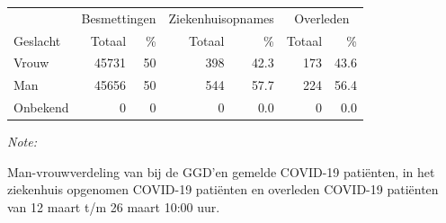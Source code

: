 \documentclass[
  english,
  man,floatsintext]{apa6}
\begin{document}
\begin{table}
\centering\begingroup\fontsize{11}{13}\selectfont

\begin{threeparttable}
\begin{tabular}{lrrrrrr}
\toprule
\multicolumn{1}{c}{ } & \multicolumn{2}{c}{Besmettingen} & \multicolumn{2}{c}{Ziekenhuisopnames} & \multicolumn{2}{c}{Overleden} \\
\cmidrule(l{3pt}r{3pt}){2-3} \cmidrule(l{3pt}r{3pt}){4-5} \cmidrule(l{3pt}r{3pt}){6-7}
Geslacht & Totaal & \% & Totaal & \% & Totaal & \%\\
\midrule
Vrouw & 45731 & 50 & 398 & 42.3 & 173 & 43.6\\
Man & 45656 & 50 & 544 & 57.7 & 224 & 56.4\\
Onbekend & 0 & 0 & 0 & 0.0 & 0 & 0.0\\
\bottomrule
\end{tabular}
\begin{tablenotes}
\item \textit{Note: } 
\item Man-vrouwverdeling van bij de GGD’en gemelde COVID-19 patiënten, in het ziekenhuis opgenomen COVID-19 patiënten en overleden COVID-19 patiënten van 12 maart t/m 26 maart 10:00 uur.
\end{tablenotes}
\end{threeparttable}
\endgroup{}
\end{table}
\newpage
\end{document}
